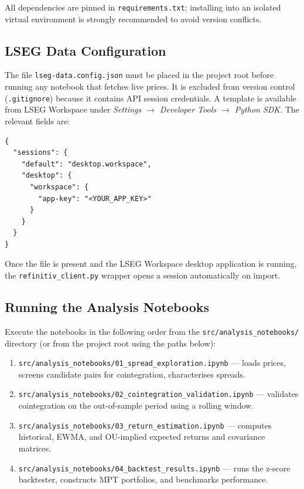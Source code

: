 \documentclass[a4paper]{report}
\begin{document}
All dependencies are pinned in \texttt{requirements.txt}; installing into an isolated virtual environment is strongly recommended to avoid version conflicts.

\subsection{LSEG Data Configuration}
\label{sec:lseg-config}

The file \texttt{lseg-data.config.json} must be placed in the project root before running any notebook that fetches live prices.  It is excluded from version control (\texttt{.gitignore}) because it contains API session credentials.  A template is available from LSEG Workspace under \emph{Settings $\rightarrow$ Developer Tools $\rightarrow$ Python SDK}.  The relevant fields are:

\begin{Verbatim}[fontsize=\small, baselinestretch=0.9]
{
  "sessions": {
    "default": "desktop.workspace",
    "desktop": {
      "workspace": {
        "app-key": "<YOUR_APP_KEY>"
      }
    }
  }
}
\end{Verbatim}

Once the file is present and the LSEG Workspace desktop application is running, the \texttt{refinitiv\_client.py} wrapper opens a session automatically on import.

\subsection{Running the Analysis Notebooks}

Execute the notebooks in the following order from the \texttt{src/analysis\_notebooks/} directory (or from the project root using the paths below):

\begin{enumerate}
    \item \texttt{src/analysis\_notebooks/01\_spread\_exploration.ipynb} --- loads prices, screens candidate pairs for cointegration, characterises spreads.
    \item \texttt{src/analysis\_notebooks/02\_cointegration\_validation.ipynb} --- validates cointegration on the out-of-sample period using a rolling window.
    \item \texttt{src/analysis\_notebooks/03\_return\_estimation.ipynb} --- computes historical, EWMA, and OU-implied expected returns and covariance matrices.
    \item \texttt{src/analysis\_notebooks/04\_backtest\_results.ipynb} --- runs the z-score backtester, constructs MPT portfolios, and benchmarks performance.
\end{enumerate}
\end{document}
